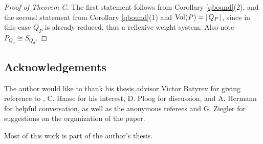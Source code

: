 \documentclass[a4paper,twoside]{article}
\newcommand{\card}[1]{{\mid\! #1 \!\mid}}
\def\vol{{\rm Vol}}
\begin{document}
\begin{proof}[Proof of Theorem C]

The first statement follows from Corollary \ref{qbound}(2), and the second statement from Corollary \ref{qbound}(1) and $\vol(P) = \card{Q_P}$, since 
in this case $Q_P$ is already reduced, thus a reflexive weight system. Also note $P_{Q_d} \cong S_{Q_d}$.

\end{proof}

\subsection*{Acknowledgements}
The author would like to thank his thesis advisor Victor Batyrev for giving reference to \cite{Pro05}, 
C. Haase for his interest, D. Ploog for discussion, and A. Hermann for helpful conversation, as well as the anonymous referees and G. Ziegler for 
suggestions on the organization of the paper.

Most of this work is part of the author's thesis.
\end{document}
